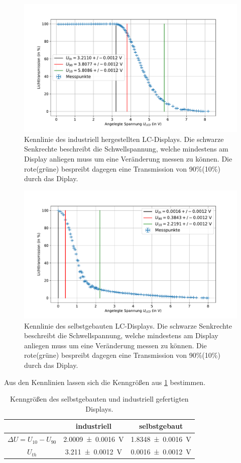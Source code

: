 \documentclass[
	a4paper,
	12pt,
	pagesize,
	ngerman
]{scrartcl}
\begin{document}
	\begin{figure}[H]
			\includegraphics[width=1\linewidth]{images/industry.pdf}
			\caption{Kennlinie des industriell hergestellten LC-Displays.
			Die schwarze Senkrechte beschreibt die Schwellspannung, welche mindestens am Display anliegen muss um eine Veränderung messen zu können.
			Die rote(grüne) bespreibt dagegen eine Transmission von 90\%(10\%) durch das Diplay.  %
			}
			\label{fig_industry}
	\end{figure}
	\begin{figure}[H]
			\includegraphics[width=1\linewidth]{images/selfmade.pdf}
			\caption{Kennlinie des selbstgebauten LC-Displays.
			Die schwarze Senkrechte beschreibt die Schwellspannung, welche mindestens am Display anliegen muss um eine Veränderung messen zu können.
			Die rote(grüne) bespreibt dagegen eine Transmission von 90\%(10\%) durch das Diplay.  %
			}
			\label{fig_selfmade}
	\end{figure}
	Aus den Kennlinien lassen sich die Kenngrößen aus \cref{tb_kenngroessen} bestimmen.
	\begin{table}[H]
		\centering
		\begin{tabular}{ c | c | c }
			 & industriell & selbstgebaut \\ \hline
			$\Delta U=U_{10}-U_{90}$&\SI{2.0009+-0.0016}{V}&\SI{1.8348+-0.0016}{V} \\
			$U_{th}$ & \SI{3.211+-0.0012}{V} & \SI{0.0016+-0.0012}{V} \\
			\hline
		\end{tabular}
		\caption{Kenngrößen des selbstgebauten und industriell gefertigten Displays.}
		\label{tb_kenngroessen}
\end{table}
\end{document}
